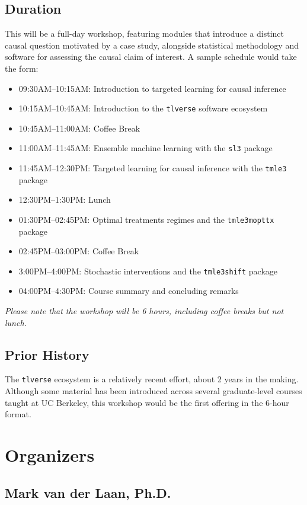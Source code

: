 \documentclass[a4paper,11pt]{texMemo}
\begin{document}
\subsection{Duration}

This will be a full-day workshop, featuring modules that introduce a distinct
causal question motivated by a case study, alongside statistical methodology and
software for assessing the causal claim of interest. A sample schedule would
take the form:
\begin{itemize}
  \itemsep0pt
  \item 09:30AM--10:15AM: Introduction to targeted learning for causal inference
  \item 10:15AM--10:45AM: Introduction to the \texttt{tlverse} software
    ecosystem
  \item 10:45AM--11:00AM: Coffee Break
  \item 11:00AM--11:45AM: Ensemble machine learning with the \texttt{sl3}
    package
  \item 11:45AM--12:30PM: Targeted learning for causal inference with the
    \texttt{tmle3} package
  \item 12:30PM--1:30PM: Lunch
  \item 01:30PM--02:45PM: Optimal treatments regimes and the
    \texttt{tmle3mopttx} package
  \item 02:45PM--03:00PM: Coffee Break
  \item 3:00PM--4:00PM: Stochastic interventions and the \texttt{tmle3shift}
    package
  \item 04:00PM--4:30PM: Course summary and concluding remarks
\end{itemize}
\textit{Please note that the workshop will be 6 hours, including coffee breaks
but not lunch.}

\subsection{Prior History}

The \texttt{tlverse} ecosystem is a relatively recent effort, about 2 years in
the making. Although some material has been introduced across several
graduate-level courses taught at UC Berkeley, this workshop would be the first
offering in the 6-hour format.

\section{Organizers}

\subsection*{Mark van der Laan, Ph.D.}
\end{document}
